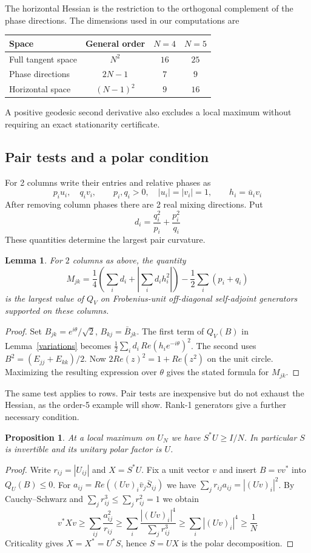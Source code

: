 \documentclass[11pt,a4paper]{article}
\newtheorem{prop}[thm]{Proposition}
\newtheorem{lem}[thm]{Lemma}
\begin{document}
The horizontal Hessian is the restriction to the orthogonal complement
of the phase directions. The dimensions used in our computations are
\begin{center}
\begin{tabular}{lccc}
\toprule
Space & General order & $N=4$ & $N=5$\\
\midrule
Full tangent space & $N^2$ & $16$ & $25$\\
Phase directions & $2N-1$ & $7$ & $9$\\
Horizontal space & $(N-1)^2$ & $9$ & $16$\\
\bottomrule
\end{tabular}
\end{center}
A positive geodesic second derivative also excludes a local maximum
without requiring an exact stationarity certificate.

\subsection{Pair tests and a polar condition}
For 2 columns write their entries and relative phases as
\[
 p_i u_i,\quad q_i v_i,\qquad
 p_i,q_i>0,\quad |u_i|=|v_i|=1,\qquad h_i=\bar u_i v_i
\]
After removing column phases there are 2 real mixing directions.
Put
\[
 d_i=\frac{q_i^2}{p_i}+\frac{p_i^2}{q_i}
\]
These quantities determine the largest pair curvature.

\begin{lem}\label{twocol}
For $2$ columns as above, the quantity
\[
 M_{jk}=\frac14\left(\sum_i d_i+
       \left|\sum_i d_i h_i^2\right|\right)-\frac12\sum_i(p_i+q_i)
\]
is the largest value of $Q_V$ on Frobenius-unit off-diagonal self-adjoint
generators supported on these columns.
\end{lem}
\begin{proof}
Set $B_{jk}=e^{i\theta}/\sqrt2$, $B_{kj}=\bar B_{jk}$. The first term
of $Q_V(B)$ in Lemma~\ref{variations} becomes $\frac12\sum_i d_i\,Re(h_i e^{-i\theta})^2$.
The second uses $B^2=(E_{jj}+E_{kk})/2$. Now
$2Re(z)^2=1+Re(z^2)$ on the unit circle.
Maximizing the resulting expression over $\theta$ gives the stated formula for $M_{jk}$.
\end{proof}

The same test applies to rows. Pair tests are inexpensive but do not
exhaust the Hessian, as the order-5 example will show. Rank-1
generators give a further necessary condition.

\begin{prop}
At a local maximum on $U_N$ we have $S^*U\ge I/N$. In particular $S$
is invertible and its unitary polar factor is $U$.
\end{prop}
\begin{proof}
Write $r_{ij}=|U_{ij}|$ and $X=S^*U$. Fix a unit vector $v$ and insert $B=vv^*$ into $Q_U(B)\le0$.
For $a_{ij}=Re((Uv)_i\bar v_j\bar S_{ij})$ we have
$\sum_j r_{ij}a_{ij}=|(Uv)_i|^2$. By Cauchy--Schwarz and
$\sum_j r_{ij}^3\le\sum_j r_{ij}^2=1$ we obtain
\[
 v^*Xv\ge\sum_{ij}\frac{a_{ij}^2}{r_{ij}}
 \ge\sum_i\frac{|(Uv)_i|^4}{\sum_j r_{ij}^3}
 \ge\sum_i |(Uv)_i|^4\ge\frac1N
\]
Criticality gives $X=X^*=U^*S$, hence $S=UX$ is the polar decomposition.
\end{proof}
\end{document}
